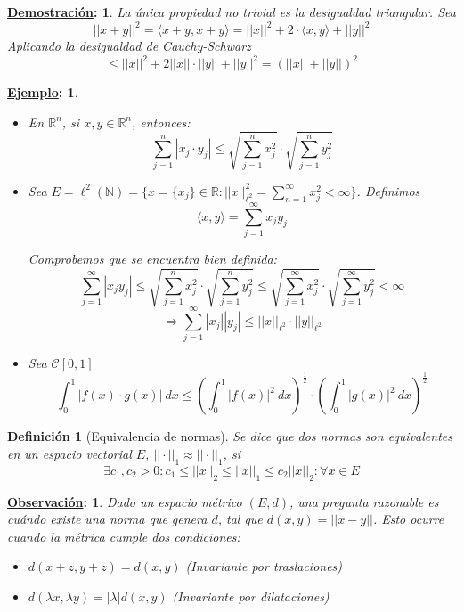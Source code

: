 \documentclass[10pt,a4paper,openright]{book}
\theoremstyle{break}
\newtheorem*{defi}{Definición}
\newtheorem*{demo}{\underline{Demostración}:}
\newtheorem*{obs}{\underline{Observación}:}
\newtheorem*{ej}{\underline{Ejemplo}:}
\newcommand{\dif}[1]{\ d#1}
\begin{document}
\begin{demo}
La única propiedad no trivial es la desigualdad triangular. Sea 
$$|| x+y||^2 = \langle x+y,x+y\rangle = ||x||^2 + 2 \cdot \langle x,y\rangle + ||y||^2$$
Aplicando la desigualdad de Cauchy-Schwarz
$$\leq ||x||^2 + 2 ||x|| \cdot ||y|| + ||y||^2 = (||x|| + ||y||)^2$$
\end{demo}

\begin{ej}
\begin{itemize}
\item En $\mathbb{R}^n$, si $x,y \in \mathbb{R}^n$, entonces:
$$\sum_{j=1}^{n} |x_j \cdot y_j | \leq \sqrt{\sum_{j=1}^{n} x_j^2} \cdot\sqrt{\sum_{j=1}^{n} y_j^2} $$

\item Sea $E = \ell^2 (\mathbb{N}) = \{x= \{x_j\} \in \mathbb{R} : ||x||^2_{\ell^2} = \sum_{n=1}^{\infty} x_j^2 < \infty\}$. Definimos 
$$\langle x,y \rangle = \sum_{j=1}^{\infty} x_j y_j$$

Comprobemos que se encuentra bien definida:
$$\sum_{j=1}^{\infty} |x_j y_j | \leq \sqrt{\sum_{j=1}^{n} x_j^2} \cdot\sqrt{\sum_{j=1}^{n} y_j^2} \leq \sqrt{\sum_{j=1}^{\infty} x_j^2} \cdot\sqrt{\sum_{j=1}^{\infty} y_j^2}  < \infty $$
$$\Rightarrow\sum_{j=1}^{\infty} |x_j|| y_j | \leq ||x||_{\ell^2} \cdot ||y||_{\ell^2}$$

\item Sea $\mathcal{C}[0,1]$
$$\int_{0}^{1} |f(x) \cdot g(x)| \dif{x} \leq \left( \int_{0}^{1} |f(x)|^2 \dif{x} \right)^\frac{1}{2} \cdot \left( \int_{0}^{1} |g(x)|^2 \dif{x} \right)^\frac{1}{2} $$
\end{itemize}
\end{ej}

\begin{defi}[Equivalencia de normas]
Se dice que dos normas son equivalentes en un espacio vectorial $E$, $|| \cdot ||_1 \approx || \cdot ||_1$, si 
$$\exists c_1,c_2 > 0 : c_1 \leq ||x||_2 \leq ||x||_1 \leq c_2 ||x||_2 : \forall x \in E$$
\end{defi}

\begin{obs}
Dado un espacio métrico $(E,d)$, una pregunta razonable es cuándo existe una norma que genera $d$, tal que $d(x,y) = ||x-y||$. Esto ocurre cuando la métrica cumple dos condiciones:
\begin{itemize}
\item $d(x+z,y+z) = d(x,y)$ (Invariante por traslaciones)

\item $d(\lambda x, \lambda y) = |\lambda | d(x,y)$ (Invariante por dilataciones)
\end{itemize}
\end{obs}
\end{document}
